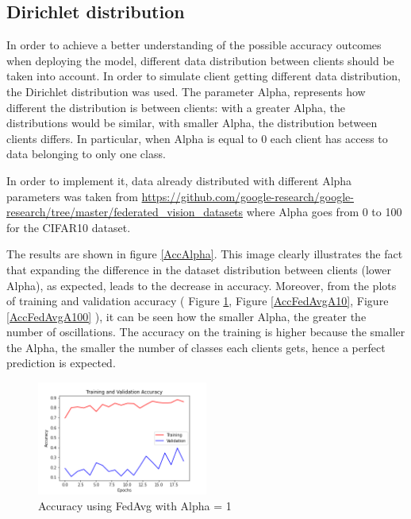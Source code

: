 \documentclass[twocolumn]{article}
\begin{document}
\subsection{Dirichlet distribution}

In order to achieve a better understanding of the possible accuracy outcomes when deploying the model, different data distribution between clients should be taken into account. In order to simulate client getting different data distribution, the Dirichlet distribution was used. The parameter Alpha, represents how different the distribution is between clients: with a greater Alpha, the distributions 
would be similar, with smaller Alpha, the distribution between clients differs.
In particular, when Alpha is equal to 0 each client has access to data belonging to only one class.

In order to implement it, data already distributed with different Alpha parameters was taken from \url{https://github.com/google-research/google-research/tree/master/federated_vision_datasets} where Alpha goes from 0 to 100 for the CIFAR10 dataset.



The results are shown in figure \ref{AccAlpha}. This image clearly illustrates the fact that expanding the difference in the dataset distribution between clients (lower Alpha), as expected, leads to the decrease in accuracy. 
Moreover, from the plots of training and validation accuracy ( Figure \ref{AccFedAvgA1}, Figure \ref{AccFedAvgA10}, Figure \ref{AccFedAvgA100} ), it can be seen how the smaller Alpha, the greater the number of oscillations.
The accuracy on the training is higher because the smaller the Alpha, the smaller the number of classes each clients gets, hence a perfect prediction is expected. 

\begin{figure}
    \centering
    \includegraphics[width=0.5\textwidth,height=.3\textheight]{2_AccuracyFedAvg_A1.png}
    \caption{Accuracy using FedAvg with Alpha = 1}
     \label{AccFedAvgA1} 
\end{figure}
\end{document}

